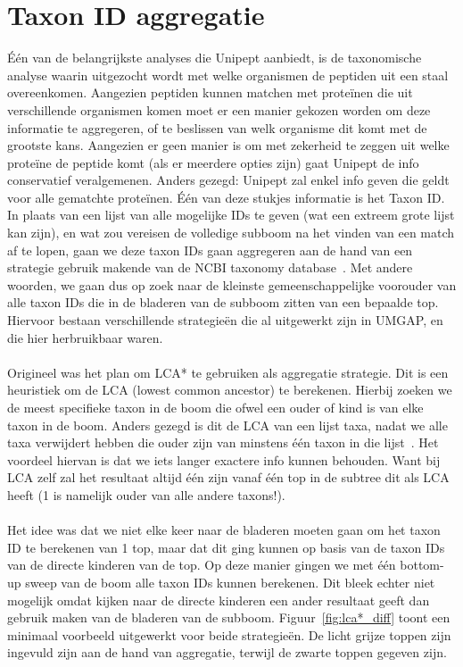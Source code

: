 \section{Taxon ID aggregatie}\label{sec:taxon-id-aggregatie}
Één van de belangrijkste analyses die Unipept aanbiedt, is de taxonomische analyse waarin uitgezocht wordt met welke organismen de peptiden uit een staal overeenkomen.
Aangezien peptiden kunnen matchen met proteïnen die uit verschillende organismen komen moet er een manier gekozen worden om deze informatie te aggregeren, of te beslissen van welk organisme dit komt met de grootste kans.
Aangezien er geen manier is om met zekerheid te zeggen uit welke proteïne de peptide komt (als er meerdere opties zijn) gaat Unipept de info conservatief veralgemenen.
Anders gezegd: Unipept zal enkel info geven die geldt voor alle gematchte proteïnen.
Één van deze stukjes informatie is het Taxon ID\@.
In plaats van een lijst van alle mogelijke IDs te geven (wat een extreem grote lijst kan zijn), en wat zou vereisen de volledige subboom na het vinden van een match af te lopen, gaan we deze taxon IDs gaan aggregeren aan de hand van een strategie gebruik makende van de NCBI taxonomy database~\cite{NCBI_original_article, NCBI_update}.
Met andere woorden, we gaan dus op zoek naar de kleinste gemeenschappelijke voorouder van alle taxon IDs die in de bladeren van de subboom zitten van een bepaalde top.
Hiervoor bestaan verschillende strategieën die al uitgewerkt zijn in UMGAP, en die hier herbruikbaar waren.
\\ \\
Origineel was het plan om LCA* te gebruiken als aggregatie strategie.
Dit is een heuristiek om de LCA (lowest common ancestor) te berekenen.
Hierbij zoeken we de meest specifieke taxon in de boom die ofwel een ouder of kind is van elke taxon in de boom.
Anders gezegd is dit de LCA van een lijst taxa, nadat we alle taxa verwijdert hebben die ouder zijn van minstens één taxon in die lijst~\cite{UMGAP_paper}.
Het voordeel hiervan is dat we iets langer exactere info kunnen behouden.
Want bij LCA zelf zal het resultaat altijd één zijn vanaf één top in de subtree dit als LCA heeft (1 is namelijk ouder van alle andere taxons!).
\\ \\
Het idee was dat we niet elke keer naar de bladeren moeten gaan om het taxon ID te berekenen van 1 top, maar dat dit ging kunnen op basis van de taxon IDs van de directe kinderen van de top.
Op deze manier gingen we met één bottom-up sweep van de boom alle taxon IDs kunnen berekenen.
Dit bleek echter niet mogelijk omdat kijken naar de directe kinderen een ander resultaat geeft dan gebruik maken van de bladeren van de subboom.
Figuur~\ref{fig:lca*_diff} toont een minimaal voorbeeld uitgewerkt voor beide strategieën.
De licht grijze toppen zijn ingevuld zijn aan de hand van aggregatie, terwijl de zwarte toppen gegeven zijn.

